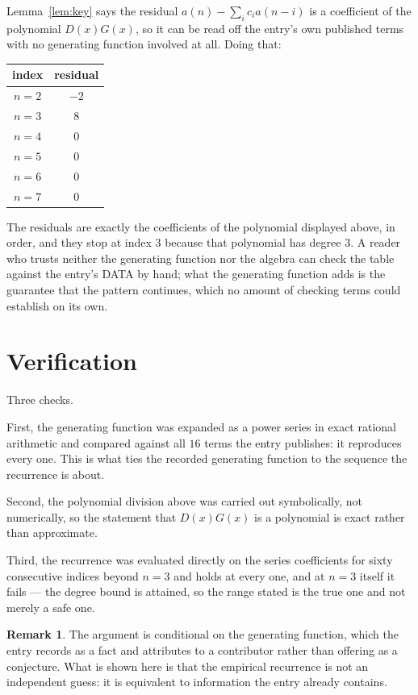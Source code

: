 \documentclass[11pt,a4paper]{article}
\theoremstyle{plain}
\theoremstyle{definition}
\newtheorem{remark}[theorem]{Remark}
\begin{document}
Lemma~\ref{lem:key} says the residual $a(n)-\sum_ic_ia(n-i)$ is a coefficient of the
polynomial $D(x)G(x)$, so it can be read off the entry's own published terms with no
generating function involved at all. Doing that:
\begin{center}
\begin{tabular}{cc}
index & residual \\ \hline
$n=2$ & $-2$ \\
$n=3$ & $8$ \\
$n=4$ & $0$ \\
$n=5$ & $0$ \\
$n=6$ & $0$ \\
$n=7$ & $0$
\end{tabular}
\end{center}
The residuals are exactly the coefficients of the polynomial displayed above, in order, and
they stop at index $3$ because that polynomial has degree $3$. A reader who trusts
neither the generating function nor the algebra can check the table against the entry's DATA
by hand; what the generating function adds is the guarantee that the pattern continues, which
no amount of checking terms could establish on its own.

\section{Verification}

Three checks.

First, the generating function was expanded as a power series in exact rational arithmetic and
compared against all $16$ terms the entry publishes: it reproduces every one. This is
what ties the recorded generating function to the sequence the recurrence is about.

Second, the polynomial division above was carried out symbolically, not numerically, so the
statement that $D(x)G(x)$ is a polynomial is exact rather than approximate.

Third, the recurrence was evaluated directly on the series coefficients for sixty consecutive
indices beyond $n=3$ and holds at every one, and at $n=3$ itself it fails --- the
degree bound is attained, so the range stated is the true one and not merely a safe one.

\begin{remark}
The argument is conditional on the generating function, which the entry records as a fact and
attributes to a contributor rather than offering as a conjecture. What is shown here is that
the empirical recurrence is not an independent guess: it is equivalent to information the
entry already contains.
\end{remark}
\end{document}
